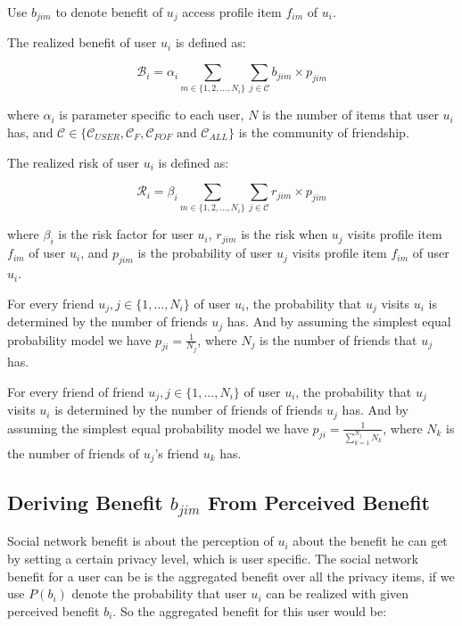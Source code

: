 \documentclass[a4paper]{article}
\begin{document}
Use $b_{jim}$ to denote benefit of $u_j$ access profile item $f_{im}$
of $u_i$.

The realized benefit of user $u_i$ is defined as:

\[ \mathcal{B}_i = \alpha_i \sum_{m\in \{1,2,\ldots,N_i\}}\sum_{j\in
  \mathcal{C}}b_{jim}\times p_{jim} \]

where $\alpha_i$ is parameter specific to each user, $N$ is the number
of items that user $u_i$ has, and $\mathcal{C}\in \{\mathcal{C}_{USER},
\mathcal{C}_{F}, \mathcal{C}_{FOF} \mbox{ and } \mathcal{C}_{ALL}\}$
is the community of friendship.

The realized risk of user $u_i$ is defined as:

\[ \mathcal{R}_i = \beta_i \sum_{m\in \{1,2,\ldots,N_i\}}\sum_{j\in
  \mathcal{C}} r_{jim}\times p_{jim} \]

where $\beta_i$ is the risk factor for user $u_i$, $r_{jim}$ is the
risk when $u_j$ visits profile item $f_{im}$ of user $u_i$, and
$p_{jim}$ is the probability of user $u_j$ visits profile item
$f_{im}$ of user $u_i$.

For every friend $u_j,j\in \{1,\ldots,N_i\}$ of user $u_i$, the
probability that $u_j$ visits $u_i$ is determined by the number of
friends $u_j$ has. And by assuming the simplest equal probability
model we have $p_{ji}=\frac{1}{N_j}$, where $N_j$ is the number of
friends that $u_j$ has.

For every friend of friend $u_j,j\in \{1,\ldots,N_i\}$ of user $u_i$,
the probability that $u_j$ visits $u_i$ is determined by the number of
friends of friends $u_j$ has. And by assuming the simplest equal
probability model we have $p_{ji}=\frac{1}{\sum_{k=1}^{N_j}N_k}$,
where $N_k$ is the number of friends of $u_j$'s friend $u_k$ has.

\subsection{Deriving Benefit $b_{jim}$ From Perceived Benefit}
Social network benefit is about the perception of $u_i$ about the
benefit he can get by setting a certain privacy level, which is user
specific. The social network benefit for a user can be is the
aggregated benefit over all the privacy items, if we use $P(b_i)$ denote
the probability that user $u_i$ can be realized with given perceived
benefit $b_i$. So the aggregated benefit for this user would be: \\
\end{document}
